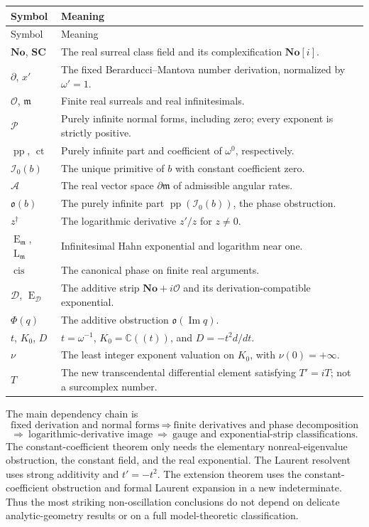 \documentclass[11pt,letterpaper]{article}
\numberwithin{equation}{section}
\theoremstyle{definition}
\theoremstyle{remark}
\newcommand{\No}{\mathbf{No}}
\newcommand{\SC}{\mathbf{SC}}
\newcommand{\C}{\mathbb C}
\newcommand{\OO}{\mathcal O}
\newcommand{\mm}{\mathfrak m}
\newcommand{\PPi}{\mathcal P}
\newcommand{\ARate}{\mathcal A}
\newcommand{\DD}{\mathcal D}
\newcommand{\der}{\partial}
\newcommand{\pp}{\operatorname{pp}}
\newcommand{\ct}{\operatorname{ct}}
\newcommand{\im}{\operatorname{Im}}
\newcommand{\cis}{\operatorname{cis}}
\newcommand{\Em}{\operatorname{E}_{\mm}}
\newcommand{\Lm}{\operatorname{L}_{\mm}}
\newcommand{\Ed}{\operatorname{E}_{\DD}}
\newcommand{\Izero}{\mathcal I_0}
\newcommand{\Obs}{\mathfrak o}
\begin{document}
\begin{longtable}{L{0.20\textwidth}L{0.70\textwidth}}
\toprule
Symbol & Meaning\\
\midrule\endfirsthead
\toprule Symbol & Meaning\\\midrule\endhead
$\No$, $\SC$ & The real surreal class field and its complexification $\No[i]$.\\
$\der$, $x'$ & The fixed Berarducci--Mantova number derivation, normalized by $\omega'=1$.\\
$\OO$, $\mm$ & Finite real surreals and real infinitesimals.\\
$\PPi$ & Purely infinite normal forms, including zero; every exponent is strictly positive.\\
$\pp$, $\ct$ & Purely infinite part and coefficient of $\omega^0$, respectively.\\
$\Izero(b)$ & The unique primitive of $b$ with constant coefficient zero.\\
$\ARate$ & The real vector space $\der\mm$ of admissible angular rates.\\
$\Obs(b)$ & The purely infinite part $\pp(\Izero(b))$, the phase obstruction.\\
$z^\dagger$ & The logarithmic derivative $z'/z$ for $z\ne0$.\\
$\Em$, $\Lm$ & Infinitesimal Hahn exponential and logarithm near one.\\
$\cis$ & The canonical phase on finite real arguments.\\
$\DD$, $\Ed$ & The additive strip $\No+i\OO$ and its derivation-compatible exponential.\\
$\Phi(q)$ & The additive obstruction $\Obs(\im q)$.\\
$t$, $K_0$, $D$ & $t=\omega^{-1}$, $K_0=\C((t))$, and $D=-t^2d/dt$.\\
$\nu$ & The least integer exponent valuation on $K_0$, with $\nu(0)=+\infty$.\\
$T$ & The new transcendental differential element satisfying $T'=iT$; not a surcomplex number.\\
\bottomrule
\end{longtable}

The main dependency chain is
\[
 \text{fixed derivation and normal forms}
 \ \Longrightarrow\ 
 \text{finite derivatives and phase decomposition}
\]
\[
 \Longrightarrow\ 
 \text{logarithmic-derivative image}
 \ \Longrightarrow\ 
 \text{gauge and exponential-strip classifications}.
\]
The constant-coefficient theorem only needs the elementary nonreal-eigenvalue obstruction, the constant field, and the real exponential. The Laurent resolvent uses strong additivity and $t'=-t^2$. The extension theorem uses the constant-coefficient obstruction and formal Laurent expansion in a new indeterminate. Thus the most striking non-oscillation conclusions do not depend on delicate analytic-geometry results or on a full model-theoretic classification.
\end{document}
